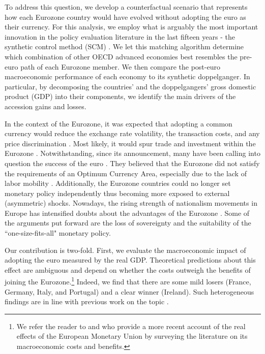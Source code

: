 \documentclass[12pt]{article}
\begin{document}
To address this question, we develop a counterfactual scenario that represents how each Eurozone country would have evolved without adopting the euro as their currency. For this analysis, we employ what is arguably the most important innovation in the policy evaluation literature in the last fifteen years - the synthetic control method (SCM) \citep{Athey2017}. We let this matching algorithm determine which combination of other OECD advanced economies best resembles the pre-euro path of each Eurozone member. We then compare the post-euro macroeconomic performance of each economy to its synthetic doppelganger. In particular, by decomposing the countries' and the doppelgangers' gross domestic product (GDP) into their components, we identify the main drivers of the accession gains and losses.

In the context of the Eurozone, it was expected that adopting a common currency would reduce the exchange rate volatility, the transaction costs, and any price discrimination \citep{DeGrauwe2020}. Most likely, it would spur trade and investment within the Eurozone \citep{Frankel1998}. Notwithstanding, since its announcement, many have been calling into question the success of the euro \citep{Wyplosz2006}. They believed that the Eurozone did not satisfy the requirements of an Optimum Currency Area, especially due to the lack of labor mobility \citep{Jonung2009}. Additionally, the Eurozone countries could no longer set monetary policy independently thus becoming more exposed to external (asymmetric) shocks. Nowadays, the rising strength of nationalism movements in Europe has intensified doubts about the advantages of the Eurozone \citep{Fligstein2012, Guiso2019}. Some of the arguments put forward are the loss of sovereignty and the suitability of the ``one-size-fits-all" monetary policy. %

Our contribution is two-fold. First, we evaluate the macroeconomic impact of adopting the euro measured by the real GDP. Theoretical predictions about this effect are ambiguous and depend on whether the costs outweigh the benefits of joining the Eurozone.\footnote{We refer the reader to \cite{Lane2006} and \cite{Beetsma2010} who provide a more recent account of the real effects of the European Monetary Union by surveying the literature on its macroeconomic costs and benefits.} Indeed, we find that there are some mild losers (France, Germany, Italy, and Portugal) and a clear winner (Ireland). Such heterogeneous findings are in line with previous work on the topic \citep{DeGrauwe2020,Puzzello2018}.
\end{document}
